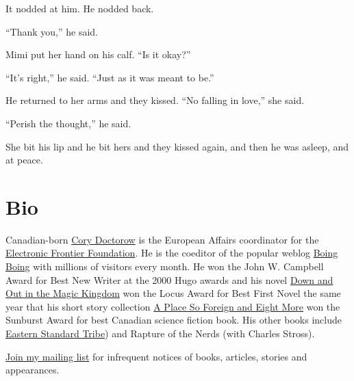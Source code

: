 It nodded at him.  He nodded back.

``Thank you,'' he said.

Mimi put her hand on his calf.  ``Is it okay?''

``It's right,'' he said.  ``Just as it was meant to be.''

He returned to her arms and they kissed.  ``No falling in love,'' she
said.

``Perish the thought,'' he said.

She bit his lip and he bit hers and they kissed again, and then he was
asleep, and at peace.

\section{Bio}

Canadian-born \href{http://www.craphound.com/}{Cory Doctorow} is
the European Affairs coordinator for the 
\href{http://www.eff.org}{Electronic Frontier Foundation}.  He is
the coeditor of the popular weblog 
\href{http://boingboing.net}{Boing Boing} with millions of visitors
every month.  He won the John W.  Campbell Award for Best New Writer
at the 2000 Hugo awards and his novel 
\href{http://craphound.com/down/}{Down and Out in the Magic
Kingdom} won the Locus Award for Best First Novel the same year
that his short story collection 
\href{http://craphound.com/place/}{A Place So Foreign and Eight
More} won the Sunburst Award for best Canadian science fiction
book.  His other books include 
\href{http://craphound.com/est/}{Eastern Standard Tribe}) and
Rapture of the Nerds (with Charles Stross).

\href{http://www.ctyme.com/mailman/listinfo/doctorow}{Join my mailing
list} for infrequent notices of books, articles, stories and
appearances.


